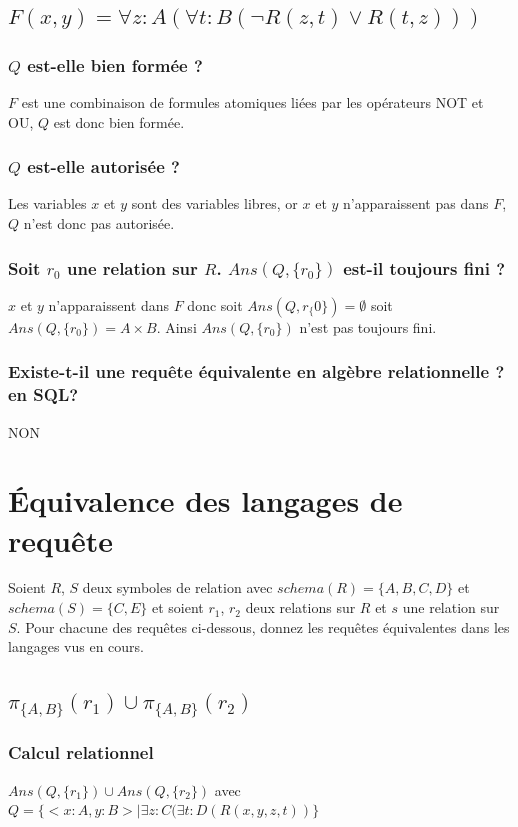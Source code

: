 \documentclass[10pt,a4paper,twoside]{article}
\begin{document}
\subsection{$F(x,y) = \forall z : A(\forall t:B(\neg R(z,t)\vee R(t,z))) $}
\subsubsection{$Q$ est-elle bien formée ?}
$F$ est une combinaison de formules atomiques liées par les opérateurs NOT et OU, $Q$ est donc bien formée.

\subsubsection{$Q$ est-elle autorisée ?}
Les variables $x$ et $y$ sont des variables libres, or $x$ et $y$ n'apparaissent pas dans $F$, $Q$ n'est donc pas autorisée.

\subsubsection{Soit $r_{0}$ une relation sur $R$. $Ans(Q,\{r_{0}\})$ est-il toujours fini ?}
$x$ et $y$ n'apparaissent dans $F$ donc soit $Ans(Q,r_\{{0}\}) = \emptyset$ soit $Ans(Q,\{r_{0}\}) = A \times B$. Ainsi $Ans(Q,\{r_{0}\})$ n'est pas toujours fini.

\subsubsection{Existe-t-il une requête équivalente en algèbre relationnelle ? en SQL?}
NON


\section{Équivalence des langages de requête}
Soient $R$, $S$ deux symboles de relation avec $schema(R) = \{A,B,C,D\}$ et $schema(S)=\{C,E\}$ et soient $r_{1}$, $r_{2}$ deux relations sur $R$ et $s$ une relation sur $S$. Pour chacune des requêtes ci-dessous, donnez les requêtes équivalentes dans les langages vus en cours.

\subsection{$\pi_{\{A,B\}}(r_{1})\cup \pi_{\{A,B\}}(r_{2})$}
\subsubsection{Calcul relationnel}
$Ans(Q,\{r_{1}\}) \cup Ans(Q,\{r_{2}\})$ avec $Q = \{<x:A, y:B> \mid \exists z:C(\exists t:D(R(x,y,z,t))\}$
\end{document}
